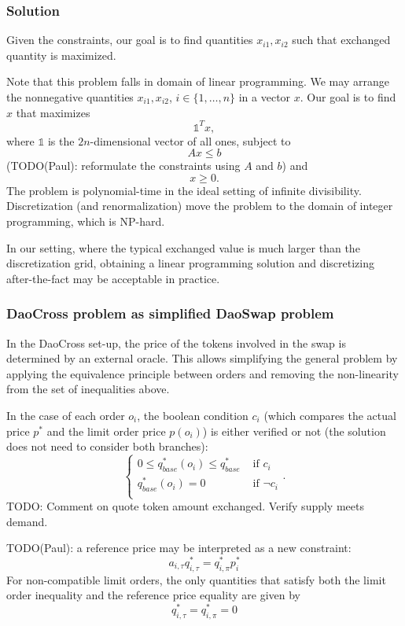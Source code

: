\documentclass[11pt, reqno]{amsart}
\theoremstyle{definition}
\theoremstyle{remark}
\begin{document}
\subsubsection{Solution}
Given the constraints, our goal is to find quantities $x_{i1}, x_{i2}$ such
that exchanged quantity is maximized.

Note that this problem falls in domain of linear programming. We may arrange
the nonnegative quantities $x_{i1}, x_{i2}$, $i \in \{1, \ldots, n\}$ in a
vector $x$. Our goal is to find $x$ that maximizes
\[
    \mathbb{1}^T x,
\]
where $\mathbb{1}$ is the $2n$-dimensional vector of all ones,
subject to
\[
    A x \leq b
\]
(TODO(Paul): reformulate the constraints using $A$ and $b$)
and
\[
    x \geq 0.
\]
The problem is polynomial-time in the ideal setting of infinite divisibility.
Discretization (and renormalization) move the problem to the domain of
integer programming, which is NP-hard.

In our setting, where the typical exchanged value is much larger than the
discretization grid, obtaining a linear programming solution and
discretizing after-the-fact may be acceptable in practice.

\subsubsection{DaoCross problem as simplified DaoSwap problem}
In the DaoCross set-up, the price of the tokens involved in the swap is
determined by an external oracle.
This allows simplifying the general problem by applying the equivalence
principle between orders and removing the non-linearity from the set of
inequalities above.

In the case of each order $o_i$, the boolean condition $c_i$ (which compares
the actual price $p^*$ and the limit order price $p(o_i)$) is either verified
or not (the solution does not need to consider both branches):
\begin{equation}
	\begin{cases}
		0 \le q_{base}^*(o_i) \le q_{base}^* & \text{ if } c_i       \\
		q_{base}^*(o_i) = 0                & \text{ if } \lnot c_i \\
	\end{cases}.
\end{equation}
TODO: Comment on quote token amount exchanged. Verify supply meets demand.

TODO(Paul): a reference price may be interpreted as a new constraint:
\[
    a_{i, \tau} q_{i, \tau}^* = q_{i, \pi}^* p_i^*
\]
For non-compatible limit orders, the only quantities that satisfy both the
limit order inequality and the reference price equality are given by
\[
    q_{i, \tau}^* = q_{i, \pi}^* = 0
\]
\end{document}
